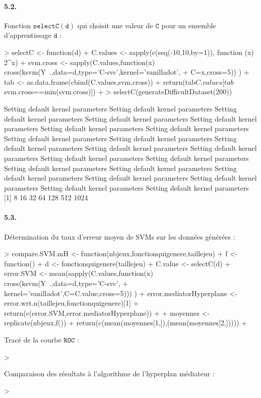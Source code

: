 \documentclass{article}
\begin{document}
\paragraph{5.2.}Fonction $\mathtt{selectC(d)}$ qui choisit une valeur de
 $\mathtt{C}$ pour un ensemble d'apprentissage $\mathtt{d}$ :
\begin{Schunk}
\begin{Sinput}
> selectC <- function(d) {
+ 	C.values <- sapply(c(seq(-10,10,by=1)), function (x) 2^x)
+ 	svm.cross <- sapply(C.values,function(x) cross(ksvm(Y~.,data=d,type='C-svc',kernel='vanilladot',
+ 		C=x,cross=5)) )
+ 	tab <- as.data.frame(cbind(C.values,svm.cross))
+ 	return(tab$C.values[tab$svm.cross==min(svm.cross)])
+ }
> selectC(generateDifficultDataset(200))
\end{Sinput}
\begin{Soutput}
 Setting default kernel parameters  
 Setting default kernel parameters  
 Setting default kernel parameters  
 Setting default kernel parameters  
 Setting default kernel parameters  
 Setting default kernel parameters  
 Setting default kernel parameters  
 Setting default kernel parameters  
 Setting default kernel parameters  
 Setting default kernel parameters  
 Setting default kernel parameters  
 Setting default kernel parameters  
 Setting default kernel parameters  
 Setting default kernel parameters  
 Setting default kernel parameters  
 Setting default kernel parameters  
 Setting default kernel parameters  
 Setting default kernel parameters  
 Setting default kernel parameters  
 Setting default kernel parameters  
 Setting default kernel parameters  
[1]    8   16   32   64  128  512 1024
\end{Soutput}
\end{Schunk}
\paragraph{5.3.}Détermination du taux d'erreur moyen de SVMs sur les 
données générées :
\begin{Schunk}
\begin{Sinput}
> compare.SVM.mH <- function(nbjeux,fonctionquigenere,taillejeu) {
+ 	f <- function() {
+ 		d <- fonctionquigenere(taillejeu)
+ 		C.value <- selectC(d)
+ 		error.SVM <- mean(sapply(C.values,function(x) cross(ksvm(Y~.,data=d,type='C-svc',
+ 			kernel='vanilladot',C=C.value,cross=5))) )
+ 		error.mediatorHyperplane <- error.wrt.n(taillejeu,fonctionquigenere)[1]
+ 		return(c(error.SVM,error.mediatorHyperplane))
+ 	}
+ 	moyennes <- replicate(nbjeux,f())
+ 	return(c(mean(moyennes[1,]),(mean(moyennes[2,]))))
+ }
\end{Sinput}
\end{Schunk}
Tracé de la courbe $\mathtt{ROC}$ :
\begin{Schunk}
\begin{Sinput}
> 
\end{Sinput}
\end{Schunk}
Comparaison des résultats à l'algorithme de l'hyperplan médiateur :
\begin{Schunk}
\begin{Sinput}
> 
\end{Sinput}
\end{Schunk}
\end{document}
